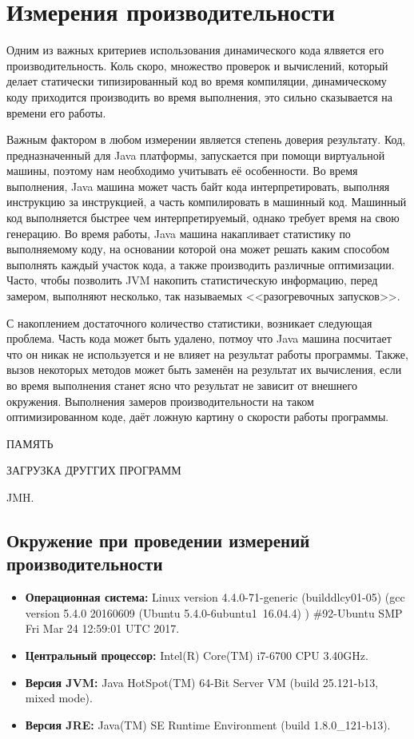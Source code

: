 \section{Измерения производительности}

Одним из важных критериев использования динамического кода ялвяется его производительность. Коль скоро, множество проверок и вычислений, который делает статически типизированный код во время компиляции, динамическому коду приходится производить во время выполнения, это сильно сказывается на времени его работы.

Важным фактором в любом измерении является степень доверия результату. Код, предназначенный для Java платформы, запускается при помощи виртуальной машины, поэтому нам необходимо учитывать её особенности. Во время выполнения, Java машина может часть байт кода интерпретировать, выполняя инструкцию за инструкцией, а часть  компилировать в машинный код. Машинный код выполняется быстрее чем интерпретируемый, однако требует время на свою генерацию. Во время работы, Java машина накапливает статистику по выполняемому коду, на основании которой она может решать каким способом выполнять каждый участок кода, а также производить различные оптимизации. Часто, чтобы позволить JVM накопить статистическую информацию, перед замером, выполняют несколько, так называемых <<разогревочных запусков>>.

С накоплением достаточного количество статистики, возникает следующая проблема. Часть кода может быть удалено, потмоу что Java машина посчитает что он никак не используется и не влияет на результат работы программы. Также, вызов некоторых методов может быть заменён на результат их вычисления, если во время выполнения станет ясно что результат не зависит от внешнего окружения. Выполнения замеров производительности на таком оптимизированном коде, даёт ложную картину о скорости работы программы.

ПАМЯТЬ

ЗАГРУЗКА ДРУГГИХ ПРОГРАММ

JMH.

\subsection{Окружение при проведении измерений производительности}

\begin{itemize}
    \item \textbf{Операционная система:} Linux version 4.4.0-71-generic (buildd\at lcy01-05) (gcc version 5.4.0 20160609 (Ubuntu 5.4.0-6ubuntu1~16.04.4) ) \#92-Ubuntu SMP Fri Mar 24 12:59:01 UTC 2017.
    \item \textbf{Центральный процессор:}  Intel(R) Core(TM) i7-6700 CPU \at 3.40GHz.
    \item \textbf{Версия JVM:}  Java HotSpot(TM) 64-Bit Server VM (build 25.121-b13, mixed mode).
    \item \textbf{Версия JRE:}  Java(TM) SE Runtime Environment (build 1.8.0\_121-b13).
\end{itemize}